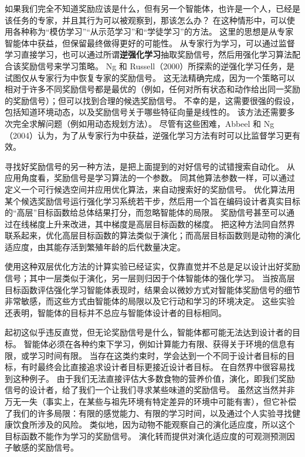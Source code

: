 \documentclass[UTF8,12pt,a4paper,fontset=fandol]{ctexart}
\begin{document}
如果我们完全不知道奖励应该是什么，但有另一个智能体，也许是一个人，已经是该任务的专家，并且其行为可以被观察到，那该怎么办？
在这种情形中，可以使用各种称为“模仿学习”“从示范学习”和“学徒学习”的方法。
这里的思想是从专家智能体中获益，但保留最终做得更好的可能性。
从专家行为学习，可以通过监督学习直接学习，也可以通过所谓\textbf{逆强化学习}抽取奖励信号，然后用强化学习算法配合该奖励信号来学习策略。
Ng 和 Russell（2000）所探索的逆强化学习任务，是试图仅从专家行为中恢复专家的奖励信号。
这无法精确完成，因为一个策略可以相对于许多不同奖励信号都是最优的（例如，任何对所有状态和动作给出同一奖励的奖励信号）；但可以找到合理的候选奖励信号。
不幸的是，这需要很强的假设，包括知道环境动态，以及奖励信号关于哪些特征向量是线性的。
该方法还需要多次完全求解问题（例如用动态规划方法）。
尽管有这些困难，Abbeel 和 Ng（2004）认为，为了从专家行为中获益，逆强化学习方法有时可以比监督学习更有效。

寻找好奖励信号的另一种方法，是把上面提到的对好信号的试错搜索自动化。
从应用角度看，奖励信号是学习算法的一个参数。
同其他算法参数一样，可以通过定义一个可行候选空间并应用优化算法，来自动搜索好的奖励信号。
优化算法用某个候选奖励信号运行强化学习系统若干步，然后用一个旨在编码设计者真实目标的“高层”目标函数给总体结果打分，而忽略智能体的局限。
奖励信号甚至可以通过在线梯度上升来改进，其中梯度是高层目标函数的梯度。
把这种方法同自然界联系起来，优化高层目标函数的算法类似于演化；而高层目标函数则是动物的演化适应度，由其能存活到繁殖年龄的后代数量决定。

使用这种双层优化方法的计算实验已经证实，仅靠直觉并不总是足以设计出好奖励信号；其中一层类似于演化，另一层则归因于个体智能体的强化学习。
当按高层目标函数评估强化学习智能体表现时，结果会以微妙方式对智能体奖励信号的细节非常敏感，而这些方式由智能体的局限以及它行动和学习的环境决定。
这些实验还表明，智能体的目标并不总应与智能体设计者的目标相同。

起初这似乎违反直觉，但无论奖励信号是什么，智能体都可能无法达到设计者的目标。
智能体必须在各种约束下学习，例如计算能力有限、获得关于环境的信息有限，或学习时间有限。
当存在这类约束时，学会达到一个不同于设计者目标的目标，有时最终会比直接追求设计者目标更接近设计者目标。
在自然界中很容易找到这种例子。
由于我们无法直接评估大多数食物的营养价值，演化，即我们奖励信号的设计者，给了我们一个让我们寻求某些味道的奖励信号。
虽然这当然并非万无一失（事实上，在某些与祖先环境有特定差异的环境中可能有害），但它补偿了我们的许多局限：有限的感觉能力、有限的学习时间，以及通过个人实验寻找健康饮食所涉及的风险。
类似地，因为动物不能观察自己的演化适应度，所以这个目标函数不能作为学习的奖励信号。
演化转而提供对演化适应度的可观测预测因子敏感的奖励信号。
\end{document}
